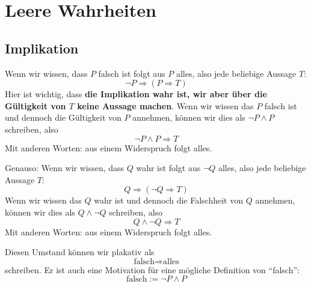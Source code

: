 \documentclass[a4paper]{amsart}
\theoremstyle{definition}
\begin{document}
\section{Leere Wahrheiten}

\subsection{Implikation}
Wenn wir wissen, dass $P$ falsch ist folgt aus $P$ alles, also jede beliebige Aussage $T$:
\begin{equation}
   \neg P \Rightarrow (P  \Rightarrow T)
\end{equation} 
Hier ist wichtig, dass \textbf{die Implikation wahr ist, wir aber über die Gültigkeit von $T$ keine Aussage machen}.
Wenn wir wissen das $P$ falsch ist und dennoch die Gültigkeit von $P$ annehmen, können wir dies als $\neg P \land P$ schreiben, also
\begin{equation}
   \neg P \land P  \Rightarrow T
\end{equation} 
Mit anderen Worten: aus einem Widerspruch folgt alles.

Genauso:
Wenn wir wissen, dass $Q$ wahr ist folgt aus $\neg Q$ alles, also jede beliebige Aussage $T$:
\begin{equation}
   Q \Rightarrow (\neg Q  \Rightarrow T)
\end{equation} 
Wenn wir wissen das $Q$ wahr ist und dennoch die Falschheit von $Q$ annehmen, können wir dies als $Q \land \neg Q$ schreiben, also
\begin{equation}
   Q \land \neg Q  \Rightarrow T
\end{equation} 
Mit anderen Worten: aus einem Widerspruch folgt alles.

Diesen Umstand können wir plakativ als
\begin{equation}
   \text{falsch} \Rightarrow \text{alles}
\end{equation}
schreiben. Er ist auch eine Motivation für eine mögliche Definition von "`falsch"':
\begin{equation}
   \text{falsch} := \neg P \land P
\end{equation}
\end{document}
